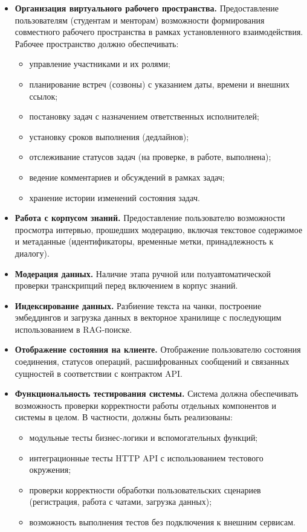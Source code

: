 \documentclass{article}
\begin{document}
\begin{itemize}
\item \textbf{Организация виртуального рабочего пространства.}  
Предоставление пользователям (студентам и менторам) возможности формирования совместного рабочего пространства в рамках установленного взаимодействия. Рабочее пространство должно обеспечивать:
\begin{itemize}
\item управление участниками и их ролями;
\item планирование встреч (созвоны) с указанием даты, времени и внешних ссылок;
\item постановку задач с назначением ответственных исполнителей;
\item установку сроков выполнения (дедлайнов);
\item отслеживание статусов задач (на проверке, в работе, выполнена);
\item ведение комментариев и обсуждений в рамках задач;
\item хранение истории изменений состояния задач.
\end{itemize}

\item \textbf{Работа с корпусом знаний.}  
Предоставление пользователю возможности просмотра интервью, прошедших модерацию, включая текстовое содержимое и метаданные (идентификаторы, временные метки, принадлежность к диалогу).

\item \textbf{Модерация данных.}  
Наличие этапа ручной или полуавтоматической проверки транскрипций перед включением в корпус знаний.

\item \textbf{Индексирование данных.}  
Разбиение текста на чанки, построение эмбеддингов и загрузка данных в векторное хранилище с последующим использованием в RAG-поиске.

\item \textbf{Отображение состояния на клиенте.}  
Отображение пользователю состояния соединения, статусов операций, расшифрованных сообщений и связанных сущностей в соответствии с контрактом API.



\item \textbf{Функциональность тестирования системы.}  
Система должна обеспечивать возможность проверки корректности работы отдельных компонентов и системы в целом. В частности, должны быть реализованы:
\begin{itemize}
\item модульные тесты бизнес-логики и вспомогательных функций;
\item интеграционные тесты HTTP API с использованием тестового окружения;
\item проверки корректности обработки пользовательских сценариев (регистрация, работа с чатами, загрузка данных);
\item возможность выполнения тестов без подключения к внешним сервисам.
\end{itemize}


\end{itemize}
\end{document}
